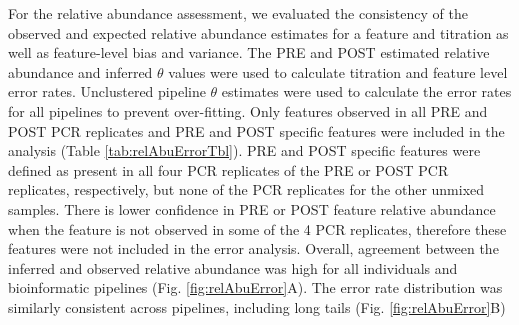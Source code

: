 \documentclass{bmcart}
\begin{document}
\begin{table}

\caption{\label{tab:relAbuErrorTbl}Maximum feature-level error rate bias (median error rate) and variance (robust COV) by pipeline and individual.}
\centering
{}
\end{table}

For the relative abundance assessment, we evaluated the consistency of
the observed and expected relative abundance estimates for a feature and
titration as well as feature-level bias and variance. The PRE and POST
estimated relative abundance and inferred \(\theta\) values were used to
calculate titration and feature level error rates. Unclustered pipeline
\(\theta\) estimates were used to calculate the error rates for all
pipelines to prevent over-fitting. Only features observed in all PRE and
POST PCR replicates and PRE and POST specific features were included in
the analysis (Table \ref{tab:relAbuErrorTbl}). PRE and POST specific
features were defined as present in all four PCR replicates of the PRE
or POST PCR replicates, respectively, but none of the PCR replicates for
the other unmixed samples. There is lower confidence in PRE or POST
feature relative abundance when the feature is not observed in some of
the 4 PCR replicates, therefore these features were not included in the
error analysis. Overall, agreement between the inferred and observed
relative abundance was high for all individuals and bioinformatic
pipelines (Fig. \ref{fig:relAbuError}A). The error rate distribution was
similarly consistent across pipelines, including long tails (Fig.
\ref{fig:relAbuError}B)
\end{document}
